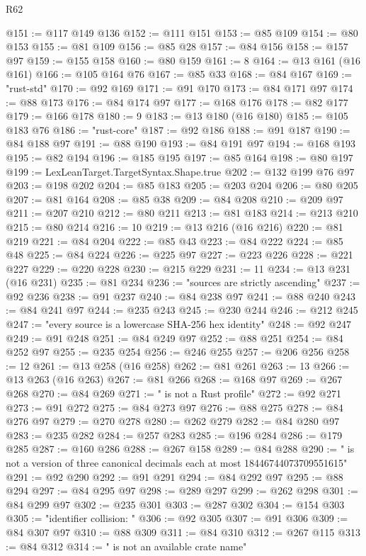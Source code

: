 \begin{lexlean}{R62}
\begin{coremodule}
@151 := @117 @149 @136
@152 := @111 @151
@153 := @85 @109
@154 := @80 @153
@155 := @81 @109
@156 := @85 @28
@157 := @84 @156
@158 := @157 @97
@159 := @155 @158
@160 := @80 @159
@161 := 8
@164 := @13 @161 (@16 @161)
@166 := @105 @164 @76
@167 := @85 @33
@168 := @84 @167
@169 := "rust-std"
@170 := @92 @169
@171 := @91 @170
@173 := @84 @171 @97
@174 := @88 @173
@176 := @84 @174 @97
@177 := @168 @176
@178 := @82 @177
@179 := @166 @178
@180 := 9
@183 := @13 @180 (@16 @180)
@185 := @105 @183 @76
@186 := "rust-core"
@187 := @92 @186
@188 := @91 @187
@190 := @84 @188 @97
@191 := @88 @190
@193 := @84 @191 @97
@194 := @168 @193
@195 := @82 @194
@196 := @185 @195
@197 := @85 @164
@198 := @80 @197
@199 := LexLeanTarget.TargetSyntax.Shape.true
@202 := @132 @199 @76 @97
@203 := @198 @202
@204 := @85 @183
@205 := @203 @204
@206 := @80 @205
@207 := @81 @164
@208 := @85 @38
@209 := @84 @208
@210 := @209 @97
@211 := @207 @210
@212 := @80 @211
@213 := @81 @183
@214 := @213 @210
@215 := @80 @214
@216 := 10
@219 := @13 @216 (@16 @216)
@220 := @81 @219
@221 := @84 @204
@222 := @85 @43
@223 := @84 @222
@224 := @85 @48
@225 := @84 @224
@226 := @225 @97
@227 := @223 @226
@228 := @221 @227
@229 := @220 @228
@230 := @215 @229
@231 := 11
@234 := @13 @231 (@16 @231)
@235 := @81 @234
@236 := "sources are strictly ascending"
@237 := @92 @236
@238 := @91 @237
@240 := @84 @238 @97
@241 := @88 @240
@243 := @84 @241 @97
@244 := @235 @243
@245 := @230 @244
@246 := @212 @245
@247 := "every source is a lowercase SHA-256 hex identity"
@248 := @92 @247
@249 := @91 @248
@251 := @84 @249 @97
@252 := @88 @251
@254 := @84 @252 @97
@255 := @235 @254
@256 := @246 @255
@257 := @206 @256
@258 := 12
@261 := @13 @258 (@16 @258)
@262 := @81 @261
@263 := 13
@266 := @13 @263 (@16 @263)
@267 := @81 @266
@268 := @168 @97
@269 := @267 @268
@270 := @84 @269
@271 := " is not a Rust profile"
@272 := @92 @271
@273 := @91 @272
@275 := @84 @273 @97
@276 := @88 @275
@278 := @84 @276 @97
@279 := @270 @278
@280 := @262 @279
@282 := @84 @280 @97
@283 := @235 @282
@284 := @257 @283
@285 := @196 @284
@286 := @179 @285
@287 := @160 @286
@288 := @267 @158
@289 := @84 @288
@290 := " is not a version of three canonical decimals each at most 18446744073709551615"
@291 := @92 @290
@292 := @91 @291
@294 := @84 @292 @97
@295 := @88 @294
@297 := @84 @295 @97
@298 := @289 @297
@299 := @262 @298
@301 := @84 @299 @97
@302 := @235 @301
@303 := @287 @302
@304 := @154 @303
@305 := "identifier collision: "
@306 := @92 @305
@307 := @91 @306
@309 := @84 @307 @97
@310 := @88 @309
@311 := @84 @310
@312 := @267 @115
@313 := @84 @312
@314 := " is not an available crate name"

\end{coremodule}
\end{lexlean}
